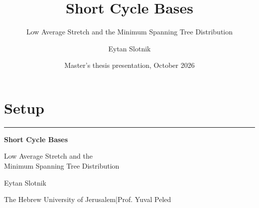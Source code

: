 \documentclass[11pt,aspectratio=169]{beamer}
\title[Short Cycle Bases]{Short Cycle Bases}
\subtitle{Low Average Stretch and the Minimum Spanning Tree Distribution}
\author{Eytan Slotnik}
\institute{The Hebrew University of Jerusalem\\Advisor: Prof. Sasha Sodin}
\date{Master's thesis presentation, October 2026}
\begin{document}
\section{Setup}


\begin{frame}[plain]
 \vspace{1.1cm}
 {\color{thesisTeal}\rule{1.8cm}{3pt}}\par\vspace{.42cm}
 {\LARGE\bfseries Short Cycle Bases}\par\vspace{.22cm}
 {\large Low Average Stretch and the\\Minimum Spanning Tree Distribution}\par
 \vspace{1.35cm}
 {\normalsize Eytan Slotnik}\par
 {\small The Hebrew University of Jerusalem\quad |\quad Prof. Yuval Peled}\par
\end{frame}



\end{document}
